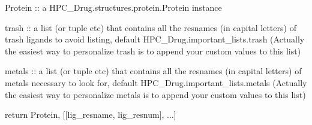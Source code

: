         Protein :: a HPC\_Drug.structures.protein.Protein instance

        trash :: a list (or tuple etc) that contains all the resnames (in capital letters) of trash ligands to avoid listing, default HPC\_Drug.important\_lists.trash (Actually the easiest way to personalize trash is to append your custom values to this list)

        metals :: a list (or tuple etc) that contains all the resnames (in capital letters) of metals necessary to look for, default HPC\_Drug.important\_lists.metals (Actually the easiest way to personalize metals is to append your custom values to this list)

        return Protein, [[lig\_resname, lig\_resnum], ...]